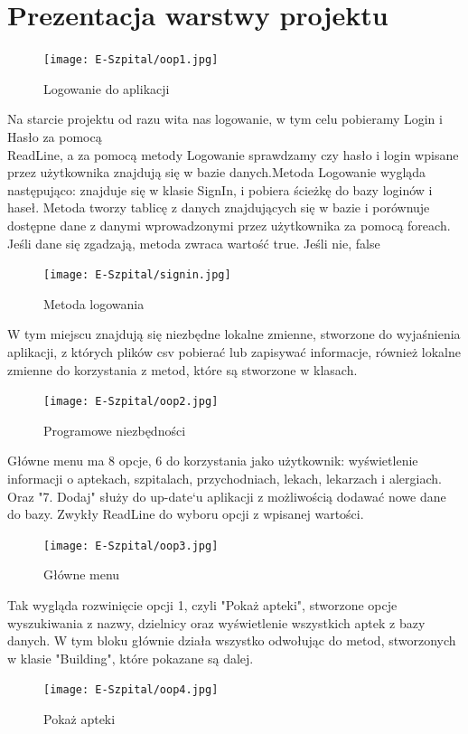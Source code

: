 \section{Prezentacja warstwy projektu}
\begin{figure}[!ht]
	\centering
		\texttt{[image: E-Szpital/oop1.jpg]}
	\caption{\footnotesize Logowanie do aplikacji}
	\label{fig:plotend}
\end{figure}\newline
Na starcie projektu od razu wita nas logowanie, w tym celu pobieramy Login i Hasło za pomocą\\ ReadLine, a za pomocą metody Logowanie sprawdzamy czy hasło i login wpisane przez użytkownika znajdują się w bazie danych.\newpage Metoda Logowanie wygląda następująco: znajduje się w klasie SignIn, i pobiera ścieżkę do bazy loginów i haseł. Metoda tworzy tablicę z danych znajdujących się w bazie i porównuje dostępne dane z danymi wprowadzonymi przez użytkownika za pomocą foreach. Jeśli dane się zgadzają, metoda zwraca wartość true. Jeśli nie, false
\newline
\begin{figure}[!ht]
	\centering
		\texttt{[image: E-Szpital/signin.jpg]}
	\caption{\footnotesize Metoda logowania}
	\label{fig:plotend}
\end{figure}\newpage
W tym miejscu znajdują się niezbędne lokalne zmienne, stworzone do wyjaśnienia aplikacji, z których plików csv pobierać lub zapisywać informacje, również lokalne zmienne do korzystania z metod, które są stworzone w klasach. \newline
\begin{figure}[!ht]
	\centering
		\texttt{[image: E-Szpital/oop2.jpg]}
	\caption{\footnotesize Programowe niezbędności}
	\label{fig:plotend}
\end{figure}\newpage
Główne menu ma 8 opcje, 6 do korzystania jako użytkownik: wyświetlenie informacji o aptekach, szpitalach, przychodniach, lekach, lekarzach i alergiach. Oraz "7. Dodaj" służy do up-date`u aplikacji z możliwością dodawać nowe dane do bazy. Zwykły ReadLine do wyboru opcji z wpisanej wartości. \newline
\begin{figure}[!ht]
	\centering
		\texttt{[image: E-Szpital/oop3.jpg]}
	\caption{\footnotesize Główne menu}
	\label{fig:plotend}
\end{figure}\newpage
Tak wygląda rozwinięcie opcji 1, czyli "Pokaż apteki", stworzone opcje wyszukiwania z nazwy, dzielnicy oraz wyświetlenie wszystkich aptek z bazy danych. W tym bloku głównie działa wszystko odwołując do metod, stworzonych w klasie "Building", które pokazane są dalej. \newline
\begin{figure}[!ht]
	\centering
		\texttt{[image: E-Szpital/oop4.jpg]}
	\caption{\footnotesize Pokaż apteki}
	\label{fig:plotend}
\end{figure}\newpage

